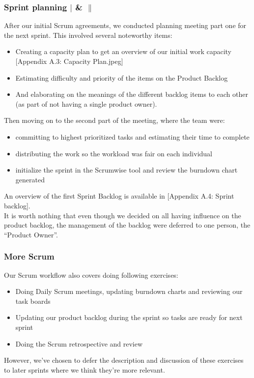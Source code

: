 \subsubsection{Sprint planning $|$ \& $\|$}
After our initial Scrum agreements, we conducted planning meeting part one for the next sprint. This involved several noteworthy items:
\begin{itemize}
\item Creating a capacity plan to get an overview of our initial work capacity [Appendix A.3: Capacity Plan.jpeg]
\item Estimating difficulty and priority of the items on the Product Backlog
\item And elaborating on the meanings of the different backlog items to each other (as part of not having a single product owner).
\end{itemize}
Then moving on to the second part of the meeting, where the team were:
\begin{itemize}
\item committing to highest prioritized tasks and estimating their time to complete
\item distributing the work so the workload was fair on each individual
\item initialize the sprint in the Scrumwise tool and review the burndown chart generated
\end{itemize}
An overview of the first Sprint Backlog is available in [Appendix A.4: Sprint backlog].\\
It is worth nothing that even though we decided on all having influence on the product backlog, the management of the backlog were deferred to one person, the “Product Owner”.\\
\subsubsection{More Scrum}
Our Scrum workflow also covers doing following exercises:\\
\begin{itemize}
\item Doing Daily Scrum meetings, updating burndown charts and reviewing our task boards
\item Updating our product backlog during the sprint so tasks are ready for next sprint
\item Doing the Scrum retrospective and review
\end{itemize}
However, we’ve chosen to defer the description and discussion of these exercises to later sprints where we think they’re more relevant.





\newpage